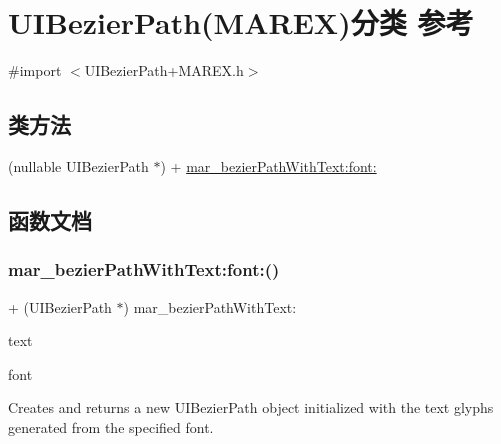 \hypertarget{category_u_i_bezier_path_07_m_a_r_e_x_08}{}\section{U\+I\+Bezier\+Path(M\+A\+R\+EX)分类 参考}
\label{category_u_i_bezier_path_07_m_a_r_e_x_08}


{\ttfamily \#import $<$U\+I\+Bezier\+Path+\+M\+A\+R\+E\+X.\+h$>$}

\subsection*{类方法}
\begin{DoxyCompactItemize}
\item 
(nullable U\+I\+Bezier\+Path $\ast$) + \hyperlink{category_u_i_bezier_path_07_m_a_r_e_x_08_a4af97ba73729f58cf760cb762aa82805}{mar\+\_\+bezier\+Path\+With\+Text\+:font\+:}
\end{DoxyCompactItemize}


\subsection{函数文档}
\mbox{\label{category_u_i_bezier_path_07_m_a_r_e_x_08_a4af97ba73729f58cf760cb762aa82805}} 
\subsubsection{\texorpdfstring{mar\+\_\+bezier\+Path\+With\+Text\+:font\+:()}{mar\_bezierPathWithText:font:()}}
{\footnotesize\ttfamily + (U\+I\+Bezier\+Path $\ast$) mar\+\_\+bezier\+Path\+With\+Text\+: \begin{DoxyParamCaption}\item[{(N\+S\+String $\ast$)}]{text }\item[{font:(U\+I\+Font $\ast$)}]{font }\end{DoxyParamCaption}}

Creates and returns a new U\+I\+Bezier\+Path object initialized with the text glyphs generated from the specified font.

